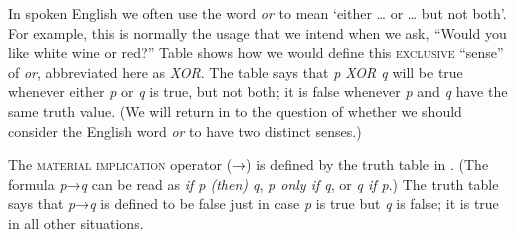 \begin{sloppypar}
In spoken English we often use the word \textit{or} to mean ‘either … or … but not both’. For example, this is normally the usage that we intend when we ask, “Would you like white wine or red?” Table  shows how we would define this \textsc{exclusive} “sense” of \textit{or}, abbreviated here as \textit{XOR}. The table says that \textit{p XOR q} will be true whenever either \textit{p} or \textit{q} is true, but not both; it is false whenever \textit{p} and \textit{q} have the same truth value. (We will return in  to the question of whether we should consider the English word \textit{or} to have two distinct senses.)
\end{sloppypar}



The \textsc{material} \textsc{implication} operator (→) is defined by the truth table in . (The formula \textit{p}→\textit{q} can be read as \textit{if p (then) q}, \textit{p only if q}, or \textit{q if p}.) The truth table says that \textit{p}→\textit{q} is defined to be false just in case \textit{p} is true but \textit{q} is false; it is true in all other situations.



